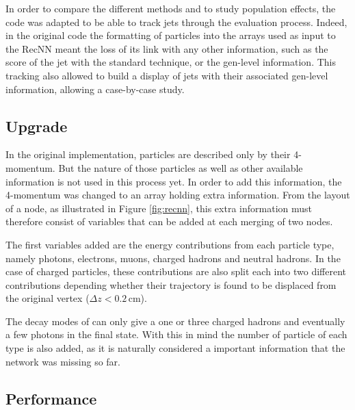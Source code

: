 In order to compare the different methods and to study population effects, the code was adapted to be able to track jets through the evaluation process. Indeed, in the original code the formatting of particles into the arrays used as input to the RecNN meant the loss of its link with any other information, such as the score of the jet with the standard technique, or the gen-level information. This tracking also allowed to build a display of jets with their associated gen-level information, allowing a case-by-case study.

\subsection{Upgrade}

In the original implementation, particles are described only by their 4-momentum. But the nature of those particles as well as other available information is not used in this process yet. In order to add this information, the 4-momentum was changed to an array holding extra information. From the layout of a node, as illustrated in Figure \ref{fig:recnn}, this extra information must therefore consist of variables that can be added at each merging of two nodes.

The first variables added are the energy contributions from each particle type, namely photons, electrons, muons, charged hadrons and neutral hadrons. In the case of charged particles, these contributions are also split each into two different contributions depending whether their trajectory is found to be displaced from the original vertex ($\Delta z < 0.2\,\mathrm{cm}$). 

The decay modes of \tauh can only give a one or three charged hadrons and eventually a few photons in the final state. With this in mind the number of particle of each type is also added, as it is naturally considered a important information that the network was missing so far.

\subsection{Performance}


